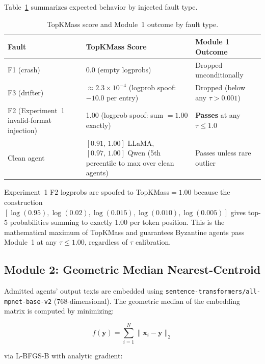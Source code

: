 \documentclass[11pt]{article}
\begin{document}
Table~\ref{tab:fault-scores} summarizes expected behavior by injected fault type.

\begin{table}[!t]
\centering
\caption{TopKMass score and Module~1 outcome by fault type.}
\label{tab:fault-scores}
{\footnotesize
\setlength{\tabcolsep}{5pt}
\renewcommand{\arraystretch}{1.08}
\begin{tabularx}{\textwidth}{p{}p{}X}
\toprule
\textbf{Fault} & \textbf{TopKMass Score} & \textbf{Module 1 Outcome} \\
\midrule
F1 (crash)
  & 0.0 (empty logprobs)
  & Dropped unconditionally \\
F3 (drifter)
  & ${\approx}2.3{\times}10^{-4}$ (logprob spoof: $-10.0$ per entry)
  & Dropped (below any $\tau > 0.001$) \\
F2 (Experiment~1 invalid-format injection)
  & 1.00 (logprob spoof: sum $= 1.00$ exactly)
  & \textbf{Passes} at any $\tau \leq 1.0$ \\
Clean agent
  & $[0.91,\,1.00]$ LLaMA, $[0.97,\,1.00]$ Qwen (5th percentile to max over clean agents)
  & Passes unless rare outlier \\
\bottomrule
\end{tabularx}
}
\end{table}

Experiment~1 F2 logprobs are spoofed to TopKMass$=1.00$ because the construction
$[\log(0.95),\log(0.02),\log(0.015),\log(0.010),\log(0.005)]$ gives top-5
probabilities summing to exactly 1.00 per token position. This is the
mathematical maximum of TopKMass and guarantees Byzantine agents pass Module~1
at any $\tau \leq 1.00$, regardless of $\tau$ calibration.

\subsection{Module 2: Geometric Median Nearest-Centroid}
\label{sec:module2}

Admitted agents' output texts are embedded using
\texttt{sentence-transformers/all-mpnet-base-v2} (768-dimensional). The
geometric median of the embedding matrix is computed by minimizing:

\begin{equation}
f(\mathbf{y}) = \sum_{i=1}^{N} \|\mathbf{x}_i - \mathbf{y}\|_2
\label{eq:geomed}
\end{equation}

via L-BFGS-B with analytic gradient:
\end{document}
